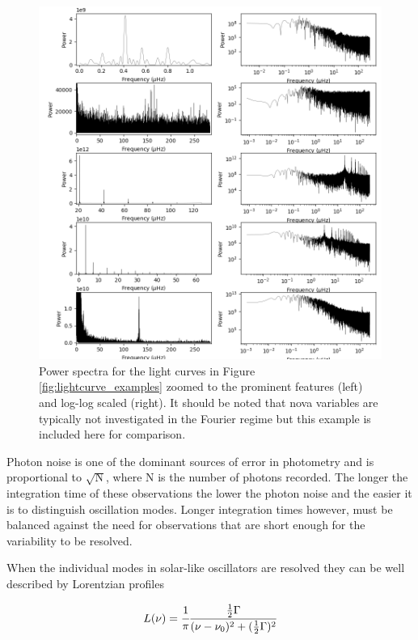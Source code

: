 \begin{figure}[p]
    \centering
    \includegraphics[width=\linewidth]{Chapter1/powerspectra.png}
    \caption[Power spectra for light curves of variable stars]{Power spectra for the light curves in Figure \ref{fig:lightcurve_examples} zoomed to the prominent features (left) and log-log scaled (right). It should be noted that nova variables are typically not investigated in the Fourier regime but this example is included here for comparison.}
    \label{fig:powerspec_examples}
\end{figure}

Photon noise is one of the dominant sources of error in photometry and is proportional to $\sqrt{\mathrm{N}}$, where N is the number of photons recorded. The longer the integration time of these observations the lower the photon noise and the easier it is to distinguish oscillation modes. Longer integration times however, must be balanced against the need for observations that are short enough for the variability to be resolved. 

When the individual modes in solar-like oscillators are resolved they can be well described by Lorentzian profiles

\begin{equation}
    L(\nu) = \cfrac{1}{\pi} \cfrac{\tfrac{1}{2} \Gamma}{(\nu-\nu_0)^2 + (\tfrac{1}{2} \Gamma)^2}
\end{equation}

